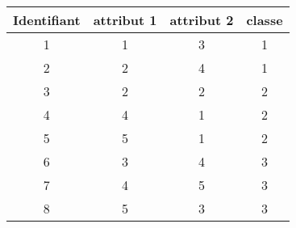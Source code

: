 \documentclass[a4paper, 11pt]{article}
\begin{document}
\begin{center}
	\begin{tabular}{|c|c|c|c|}
		\hline
		\textbf{Identifiant} & \textbf{attribut 1} & \textbf{attribut 2} & \textbf{classe}\\
		\hline
		1 & 1 & 3 & 1\\
		2 & 2 & 4 & 1\\
		3 & 2 & 2 & 2\\
		4 & 4 & 1 & 2\\
		5 & 5 & 1 & 2\\
		6 & 3 & 4 & 3\\
		7 & 4 & 5 & 3\\
		8 & 5 & 3 & 3\\
		\hline
	\end{tabular}
\end{center}
\end{document}
